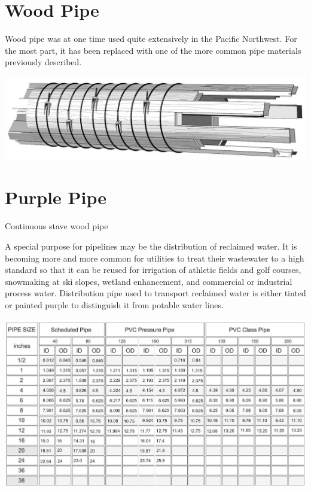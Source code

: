 \documentclass[10pt]{article}
\begin{document}
\section{Wood Pipe}
Wood pipe was at one time used quite extensively in the Pacific Northwest. For the most part, it has been replaced with one of the more common pipe materials previously described.

\includegraphics[max width=\textwidth]{2022_11_03_fc0cbc2f3612fab6edd2g-09(1)}

\section{Purple Pipe}
Continuous stave wood pipe

A special purpose for pipelines may be the distribution of reclaimed water. It is becoming more and more common for utilities to treat their wastewater to a high standard so that it can be reused for irrigation of athletic fields and golf courses, snowmaking at ski slopes, wetland enhancement, and commercial or industrial process water. Distribution pipe used to transport reclaimed water is either tinted or painted purple to distinguish it from potable water lines.

\includegraphics[max width=\textwidth]{2022_11_03_fc0cbc2f3612fab6edd2g-10}
\end{document}
